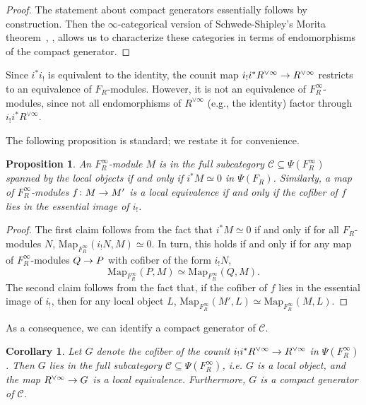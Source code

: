 \documentclass{amsart}
\renewcommand{\to}{\mathchoice{\longrightarrow}{\rightarrow}{\rightarrow}{\rightarrow}}
\let\catsymbfont\mathcal
\newcommand{\aC}{{\catsymbfont{C}}}
\newcommand{\Map}{\mathrm{Map}}%
\renewcommand{\i}{\infty}
\numberwithin{equation}{section}
\newtheorem{corollary}[equation]{Corollary}
\newtheorem{proposition}[equation]{Proposition}
\theoremstyle{definition}
\begin{document}
\begin{proof}
The statement about compact generators essentially follows by
construction.  Then the $\i$-categorical version of Schwede-Shipley's
Morita theorem~\cite{SS}, \cite[\S 7.1.2]{HAG}, allows us to
characterize these categories in terms of endomorphisms of the compact
generator. 
\end{proof}

Since $i^*i_!$ is equivalent to the identity, the counit map $i_! i^*
R^{\lor\infty}\to R^{\lor\infty}$ restricts to an equivalence of
$F_R$-modules.  However, it is not an equivalence of
$F^\infty_R$-modules, since not all endomorphisms of $R^{\lor\infty}$
(e.g., the identity) factor through $i_!i^* R^{\lor\infty}$.

The following proposition is standard; we restate it for convenience.

\begin{proposition}
An $F^\infty_R$-module $M$ is in the full subcategory
$\aC\subseteq\Psi(F^\infty_R)$ spanned by the local objects if and
only if $i^*M\simeq 0$ in $\Psi(F_R)$.  Similarly, a map of
$F^\infty_R$-modules $f \colon M\to M'$ is a local equivalence if and
only if the cofiber of $f$ lies in the essential image of $i_!$. 
\end{proposition}

\begin{proof}
The first claim follows from the fact that $i^*M\simeq 0$ if and only
if for all $F_R$-modules $N$, $\Map_{F^\infty_R}(i_! N,M)\simeq 0$.
In turn, this holds if and only if for any map of $F^\infty_R$-modules
$Q\to P$ with cofiber of the form $i_! N$,
\[
\Map_{F^\infty_R}(P,M)\simeq\Map_{F^\infty_R}(Q,M).
\]
The second claim follows from the fact that, if the cofiber of $f$
lies in the essential image of $i_!$, then for any local object $L$,
$\Map_{F^\infty_R}(M',L)\simeq\Map_{F^\infty_R}(M,L)$.
\end{proof}

As a consequence, we can identify a compact generator of $\aC$.

\begin{corollary}\label{cor:compgen}
Let $G$ denote the cofiber of the counit $i_! i^* R^{\lor\infty}\to
R^{\lor\infty}$ in $\Psi(F^\infty_R)$.  Then $G$ lies in the full
subcategory $\aC\subseteq\Psi(F^\infty_R)$, i.e. $G$ is a local
object, and the map $R^{\lor\infty}\to G$ is a local equivalence.
Furthermore, $G$ is a compact generator of $\aC$.
\end{corollary}
\end{document}

